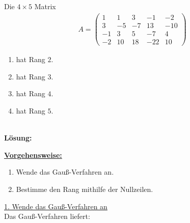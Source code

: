 \subsection*{}
Die $4 \times 5$ Matrix
\begin{align*}
A
=
\begin{pmatrix}
1 & 1  & 3 & -1 & -2 \\
3 & -5  & -7 & 13 & -10 \\
-1 & 3  & 5 & -7 & 4 \\
-2 & 10  & 18 & -22 & 10  
\end{pmatrix}
\end{align*}
\renewcommand{\labelenumi}{(\alph{enumi})}
\begin{enumerate}
	\item 
	hat Rang $2$.
	\item
	hat Rang $3$.
	\item
	hat Rang $4$.
	\item
	hat Rang $5$.
\end{enumerate}
\ \\
\textbf{Lösung:}
\begin{mdframed}
\underline{\textbf{Vorgehensweise:}}
\renewcommand{\labelenumi}{\theenumi.}
\begin{enumerate}
\item Wende das Gauß-Verfahren an.
\item Bestimme den Rang mithilfe der Nullzeilen.
\end{enumerate}
\end{mdframed}
\underline{1. Wende das Gauß-Verfahren an}\\
Das Gauß-Verfahren liefert:
